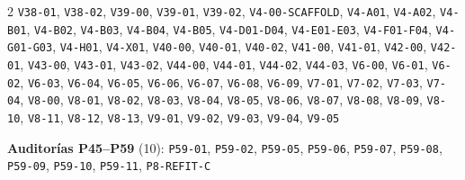 \begin{multicols}{2}
\texttt{V38-\allowbreak{}01}, \texttt{V38-\allowbreak{}02}, \texttt{V39-\allowbreak{}00}, \texttt{V39-\allowbreak{}01}, \texttt{V39-\allowbreak{}02}, \texttt{V4-\allowbreak{}00-\allowbreak{}SCAFFOLD}, \texttt{V4-\allowbreak{}A01}, \texttt{V4-\allowbreak{}A02}, \texttt{V4-\allowbreak{}B01}, \texttt{V4-\allowbreak{}B02}, \texttt{V4-\allowbreak{}B03}, \texttt{V4-\allowbreak{}B04}, \texttt{V4-\allowbreak{}B05}, \texttt{V4-\allowbreak{}D01-\allowbreak{}D04}, \texttt{V4-\allowbreak{}E01-\allowbreak{}E03}, \texttt{V4-\allowbreak{}F01-\allowbreak{}F04}, \texttt{V4-\allowbreak{}G01-\allowbreak{}G03}, \texttt{V4-\allowbreak{}H01}, \texttt{V4-\allowbreak{}X01}, \texttt{V40-\allowbreak{}00}, \texttt{V40-\allowbreak{}01}, \texttt{V40-\allowbreak{}02}, \texttt{V41-\allowbreak{}00}, \texttt{V41-\allowbreak{}01}, \texttt{V42-\allowbreak{}00}, \texttt{V42-\allowbreak{}01}, \texttt{V43-\allowbreak{}00}, \texttt{V43-\allowbreak{}01}, \texttt{V43-\allowbreak{}02}, \texttt{V44-\allowbreak{}00}, \texttt{V44-\allowbreak{}01}, \texttt{V44-\allowbreak{}02}, \texttt{V44-\allowbreak{}03}, \texttt{V6-\allowbreak{}00}, \texttt{V6-\allowbreak{}01}, \texttt{V6-\allowbreak{}02}, \texttt{V6-\allowbreak{}03}, \texttt{V6-\allowbreak{}04}, \texttt{V6-\allowbreak{}05}, \texttt{V6-\allowbreak{}06}, \texttt{V6-\allowbreak{}07}, \texttt{V6-\allowbreak{}08}, \texttt{V6-\allowbreak{}09}, \texttt{V7-\allowbreak{}01}, \texttt{V7-\allowbreak{}02}, \texttt{V7-\allowbreak{}03}, \texttt{V7-\allowbreak{}04}, \texttt{V8-\allowbreak{}00}, \texttt{V8-\allowbreak{}01}, \texttt{V8-\allowbreak{}02}, \texttt{V8-\allowbreak{}03}, \texttt{V8-\allowbreak{}04}, \texttt{V8-\allowbreak{}05}, \texttt{V8-\allowbreak{}06}, \texttt{V8-\allowbreak{}07}, \texttt{V8-\allowbreak{}08}, \texttt{V8-\allowbreak{}09}, \texttt{V8-\allowbreak{}10}, \texttt{V8-\allowbreak{}11}, \texttt{V8-\allowbreak{}12}, \texttt{V8-\allowbreak{}13}, \texttt{V9-\allowbreak{}01}, \texttt{V9-\allowbreak{}02}, \texttt{V9-\allowbreak{}03}, \texttt{V9-\allowbreak{}04}, \texttt{V9-\allowbreak{}05}\par\smallskip
\noindent\textbf{Auditorías P45--P59} (10): \texttt{P59-\allowbreak{}01}, \texttt{P59-\allowbreak{}02}, \texttt{P59-\allowbreak{}05}, \texttt{P59-\allowbreak{}06}, \texttt{P59-\allowbreak{}07}, \texttt{P59-\allowbreak{}08}, \texttt{P59-\allowbreak{}09}, \texttt{P59-\allowbreak{}10}, \texttt{P59-\allowbreak{}11}, \texttt{P8-\allowbreak{}REFIT-\allowbreak{}C}\par\smallskip

\end{multicols}
